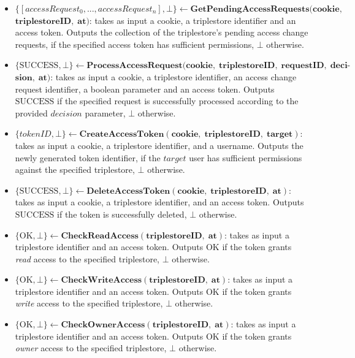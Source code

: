 \begin{definition}
\begin{itemize}
        \item $\{[accessRequest_0, ..., accessRequest_n], \bot\} \leftarrow \mathbf{GetPendingAccessRequests(cookie, }$\linebreak$\mathbf{ triplestoreID, \; at)}$: takes as input a cookie, a triplestore identifier and an access token. Outputs the collection of the triplestore's pending access change requests, if the specified access token has sufficient permissions, $\bot$ otherwise.

        \item $\{\textrm{SUCCESS}, \bot\} \leftarrow \mathbf{ProcessAccessRequest(cookie, \; triplestoreID, \; requestID, \; deci\textrm{-}}$ \linebreak $\mathbf{sion, \; at)}$: takes as input a cookie, a triplestore identifier, an access change request identifier, a boolean parameter and an access token. Outputs $\textrm{SUCCESS}$ if the specified request is successfully processed according to the provided $decision$ parameter, $\bot$ otherwise.

        \item $\{tokenID, \bot\} \leftarrow \mathbf{CreateAccessToken(cookie, \; triplestoreID, \; target)}$: takes as input a cookie, a triplestore identifier, and a username. Outputs the newly generated token identifier, if the $target$ user has sufficient permissions against the specified triplestore, $\bot$ otherwise.

        \item $\{\textrm{SUCCESS}, \bot\} \leftarrow \mathbf{DeleteAccessToken(cookie, \; triplestoreID, \; at)}$: takes as input a cookie, a triplestore identifier, and an access token. Outputs $\textrm{SUCCESS}$ if the token is successfully deleted, $\bot$ otherwise.

        \item $\{\textrm{OK}, \bot\} \leftarrow \mathbf{CheckReadAccess(triplestoreID, \; at)}$: takes as input a triplestore identifier and an access token. Outputs $\textrm{OK}$ if the token grants \emph{read} access to the specified triplestore, $\bot$ otherwise.

        \item $\{\textrm{OK}, \bot\} \leftarrow \mathbf{CheckWriteAccess(triplestoreID, \; at)}$: takes as input a triplestore identifier and an access token. Outputs $\textrm{OK}$ if the token grants \emph{write} access to the specified triplestore, $\bot$ otherwise.

        \item $\{\textrm{OK}, \bot\} \leftarrow \mathbf{CheckOwnerAccess(triplestoreID, \; at)}$: takes as input a triplestore identifier and an access token. Outputs $\textrm{OK}$ if the token grants \emph{owner} access to the specified triplestore, $\bot$ otherwise.


\end{itemize}
\end{definition}
